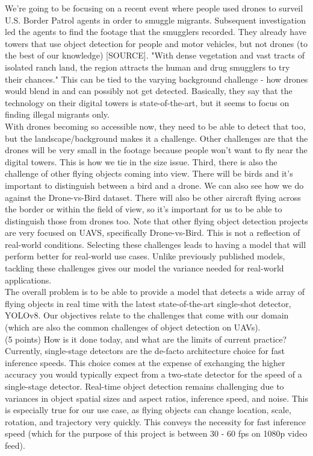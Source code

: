 \documentclass[10pt,twocolumn,letterpaper]{article}
\begin{document}
We're going to be focusing on a recent event where people used drones to surveil U.S. Border Patrol agents in order to smuggle migrants. Subsequent investigation led the agents to find the footage that the smugglers recorded. They already have towers that use object detection for people and motor vehicles, but not drones (to the best of our knowledge) [SOURCE]. "With dense vegetation and vast tracts of isolated ranch land, the region attracts the human and drug smugglers to try their chances." This can be tied to the varying background challenge - how drones would blend in and can possibly not get detected. Basically, they say that the technology on their digital towers is state-of-the-art, but it seems to focus on finding illegal migrants only. \\
With drones becoming so accessible now, they need to be able to detect that too, but the landscape/background makes it a challenge. Other challenges are that the drones will be very small in the footage because people won't want to fly near the digital towers. This is how we tie in the size issue. Third, there is also the challenge of other flying objects coming into view. There will be birds and it's important to distinguish between a bird and a drone. We can also see how we do against the Drone-vs-Bird dataset. There will also be other aircraft flying across the border or within the field of view, so it's important for us to be able to distinguish those from drones too. Note that other flying object detection projects are very focused on UAVS, specifically Drone-vs-Bird. This is not a reflection of real-world conditions. Selecting these challenges leads to having a model that will perform better for real-world use cases. Unlike previously published models, tackling these challenges gives our model the variance needed for real-world applications.\\
The overall problem is to be able to provide a model that detects a wide array of flying objects in real time with the latest state-of-the-art single-shot detector, YOLOv8. Our objectives relate to the challenges that come with our domain (which are also the common challenges of object detection on UAVs).\\

(5 points) How is it done today, and what are the limits of current practice?
Currently, single-stage detectors are the de-facto architecture choice for fast inference speeds. This choice comes at the expense of exchanging the higher accuracy you would typically expect from a two-state detector for the speed of a single-stage detector. Real-time object detection remains challenging due to variances in object spatial sizes and aspect ratios, inference speed, and noise. This is especially true for our use case, as flying objects can change location, scale, rotation, and trajectory very quickly. This conveys the necessity for fast inference speed (which for the purpose of this project is between 30 - 60 fps on 1080p video feed). \\
\end{document}
